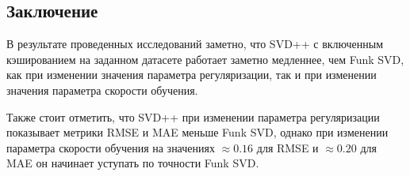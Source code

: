 \subsection*{Заключение}

В результате проведенных исследований заметно, что SVD++ с включенным кэшированием на заданном датасете работает заметно медленнее, чем Funk SVD, как при изменении значения параметра регуляризации, так и при изменении значения параметра скорости обучения.

Также стоит отметить, что SVD++ при изменении параметра регуляризации показывает метрики RMSE и MAE меньше Funk SVD, однако при изменении параметра скорости обучения на значениях $\approx 0.16$ для RMSE и $\approx 0.20$ для MAE он начинает уступать по точности Funk SVD.